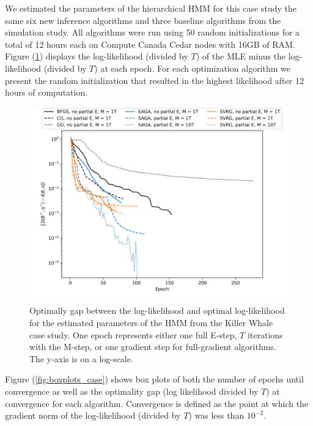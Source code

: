 We estimated the parameters of the hierarchical HMM for this case study the same six new inference algorithms and three baseline algorithms from the simulation study.
%
All algorithms were run using 50 random initializations for a total of 12 hours each on Compute Canada Cedar nodes with 16GB of RAM.
%
Figure (\ref{fig:ll_trace_case}) displays the log-likelihood (divided by $T$) of the MLE minus the log-likelihood (divided by $T$) at each epoch. For each optimization algorithm we present the random initialization that resulted in the highest likelihood after 12 hours of computation.
%
\begin{figure}
    \centering
    \includegraphics[width=6in]{../plt/log-like_v_epoch_K-3-3.png}
    \caption{Optimally gap between the log-likelihood and optimal log-likelihood for the estimated parameters of the HMM from the Killer Whale case study. One epoch represents either one full E-step, $T$ iterations with the M-step, or one gradient step for full-gradient algorithms. The y-axis is on a log-scale.}
    \label{fig:ll_trace_case}
\end{figure}
%
Figure (\ref{fig:boxplots_case}) shows box plots of both the number of epochs until convergence as well as the optimality gap (log likelihood divided by $T$) at convergence for each algorithm. Convergence is defined as the point at which the gradient norm of the log-likelihood (divided by $T$) was less than $10^{-2}$.
%
